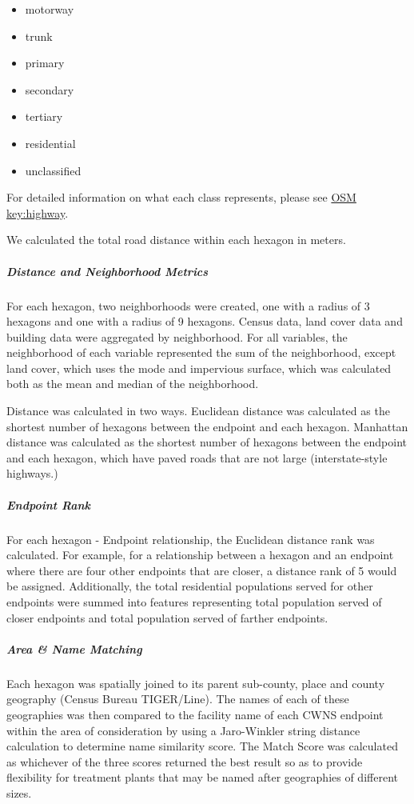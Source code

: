 \documentclass[
  letterpaper,
  DIV=11,
  numbers=noendperiod]{scrartcl}
\let\oldsubparagraph\subparagraph
\renewcommand{\subparagraph}[1]{\oldsubparagraph{#1}\mbox{}}
\providecommand{\tightlist}{%
  \setlength{\itemsep}{0pt}\setlength{\parskip}{0pt}}\usepackage{longtable,booktabs,array}
\begin{document}
\begin{itemize}
\tightlist
\item
  motorway
\item
  trunk
\item
  primary
\item
  secondary
\item
  tertiary
\item
  residential
\item
  unclassified
\end{itemize}

For detailed information on what each class represents, please see
\href{https://wiki.openstreetmap.org/wiki/Key:highway}{OSM key:highway}.

We calculated the total road distance within each hexagon in meters.

\subparagraph{Distance and Neighborhood
Metrics}\label{distance-and-neighborhood-metrics}

For each hexagon, two neighborhoods were created, one with a radius of 3
hexagons and one with a radius of 9 hexagons. Census data, land cover
data and building data were aggregated by neighborhood. For all
variables, the neighborhood of each variable represented the sum of the
neighborhood, except land cover, which uses the mode and impervious
surface, which was calculated both as the mean and median of the
neighborhood.

Distance was calculated in two ways. Euclidean distance was calculated
as the shortest number of hexagons between the endpoint and each
hexagon. Manhattan distance was calculated as the shortest number of
hexagons between the endpoint and each hexagon, which have paved roads
that are not large (interstate-style highways.)

\subparagraph{Endpoint Rank}\label{endpoint-rank}

For each hexagon - Endpoint relationship, the Euclidean distance rank
was calculated. For example, for a relationship between a hexagon and an
endpoint where there are four other endpoints that are closer, a
distance rank of 5 would be assigned. Additionally, the total
residential populations served for other endpoints were summed into
features representing total population served of closer endpoints and
total population served of farther endpoints.

\subparagraph{Area \& Name Matching}\label{area-name-matching}

Each hexagon was spatially joined to its parent sub-county, place and
county geography (Census Bureau TIGER/Line). The names of each of these
geographies was then compared to the facility name of each CWNS endpoint
within the area of consideration by using a Jaro-Winkler string distance
calculation to determine name similarity score. The Match Score was
calculated as whichever of the three scores returned the best result so
as to provide flexibility for treatment plants that may be named after
geographies of different sizes.
\end{document}
